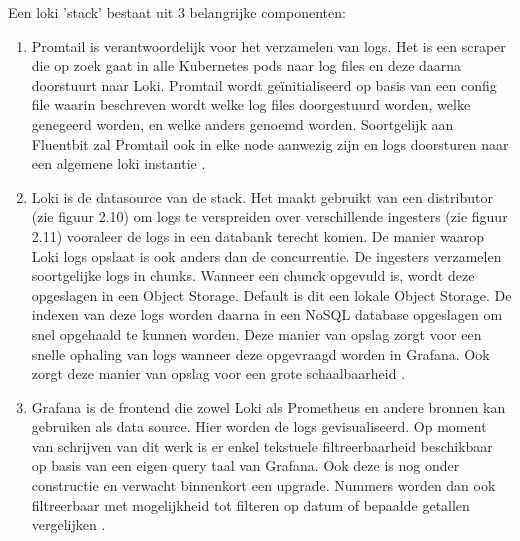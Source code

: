 Een loki 'stack' bestaat uit 3 belangrijke componenten:
\begin{enumerate}
   \item Promtail is verantwoordelijk voor het verzamelen van logs. Het is een scraper die op zoek gaat in alle Kubernetes pods naar log files en deze daarna doorstuurt naar Loki. Promtail wordt geïnitialiseerd op basis van een config file waarin beschreven wordt welke log files doorgestuurd worden, welke genegeerd worden, en welke anders genoemd worden. Soortgelijk aan Fluentbit zal Promtail ook in elke node aanwezig zijn en logs doorsturen naar een algemene loki instantie \autocite{veeramachaneni2018}.
   \item Loki is de datasource van de stack. Het maakt gebruikt van een distributor (zie figuur 2.10) om logs te verspreiden over verschillende ingesters (zie figuur 2.11) vooraleer de logs in een databank terecht komen. De manier waarop Loki logs opslaat is ook anders dan de concurrentie. De ingesters verzamelen soortgelijke logs in chunks. Wanneer een chunck opgevuld is, wordt deze opgeslagen in een Object Storage. Default is dit een lokale Object Storage. De indexen van deze logs worden daarna in een NoSQL database opgeslagen om snel opgehaald te kunnen worden. Deze manier van opslag zorgt voor een snelle ophaling van logs wanneer deze opgevraagd worden in Grafana. Ook zorgt deze manier van opslag voor een grote schaalbaarheid \autocite{veeramachaneni2018}.
   \item Grafana is de frontend die zowel Loki als Prometheus en andere bronnen kan gebruiken als data source. Hier worden de logs gevisualiseerd. Op moment van schrijven van dit werk is er enkel tekstuele filtreerbaarheid beschikbaar op basis van een eigen query taal van Grafana. Ook deze is nog onder constructie en verwacht binnenkort een upgrade. Nummers worden dan ook filtreerbaar met mogelijkheid tot filteren op datum of bepaalde getallen vergelijken \autocite{githubLoki2019, veeramachaneni2018}. 
\end{enumerate}
